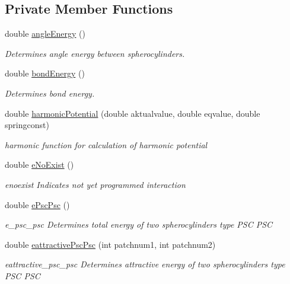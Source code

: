 \subsection*{Private Member Functions}
\begin{DoxyCompactItemize}
\item 
double \hyperlink{class_pair_energy_calculator_a41ec3ecd7b1d73204597f77aaf5ebabf}{angle\+Energy} ()
\begin{DoxyCompactList}\small\item\em Determines angle energy between spherocylinders. \end{DoxyCompactList}\item 
double \hyperlink{class_pair_energy_calculator_abfc1a82edbae71f6136a16f7af8cf41a}{bond\+Energy} ()
\begin{DoxyCompactList}\small\item\em Determines bond energy. \end{DoxyCompactList}\item 
double \hyperlink{class_pair_energy_calculator_a6b3db641c340790ddf2d3645598dbb16}{harmonic\+Potential} (double aktualvalue, double eqvalue, double springconst)
\begin{DoxyCompactList}\small\item\em harmonic function for calculation of harmonic potential \end{DoxyCompactList}\item 
double \hyperlink{class_pair_energy_calculator_a8bf4391c6f021567c6e0736cdc02b4a4}{e\+No\+Exist} ()
\begin{DoxyCompactList}\small\item\em enoexist Indicates not yet programmed interaction \end{DoxyCompactList}\item 
double \hyperlink{class_pair_energy_calculator_ac7ee3cb631ecd9ce4aa87c6fab511cf1}{e\+Psc\+Psc} ()
\begin{DoxyCompactList}\small\item\em e\+\_\+psc\+\_\+psc Determines total energy of two spherocylinders type P\+S\+C P\+S\+C \end{DoxyCompactList}\item 
double \hyperlink{class_pair_energy_calculator_ab76d04879863be74b6d8709ce8f440ad}{eattractive\+Psc\+Psc} (int patchnum1, int patchnum2)
\begin{DoxyCompactList}\small\item\em eattractive\+\_\+psc\+\_\+psc Determines attractive energy of two spherocylinders type P\+S\+C P\+S\+C \end{DoxyCompactList}\item 

\end{DoxyCompactItemize}
